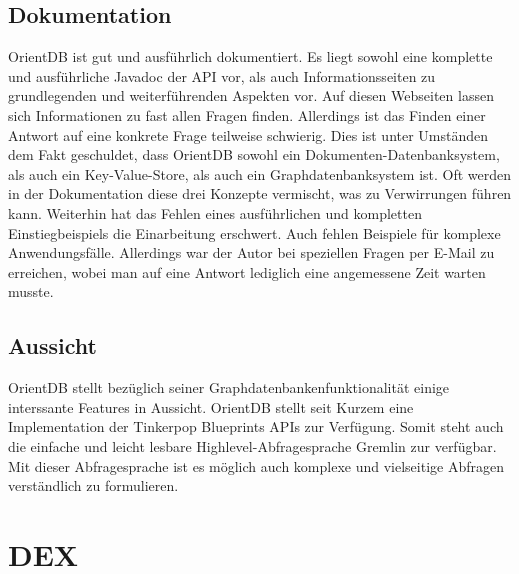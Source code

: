 \documentclass[11pt, a4paper, oneside, twocolumn]{article} %
\begin{document}
\subsection{Dokumentation}
OrientDB ist gut und ausführlich dokumentiert. Es liegt sowohl eine komplette und ausführliche Javadoc der API vor, als auch Informationsseiten zu grundlegenden und weiterführenden Aspekten vor. Auf diesen Webseiten lassen sich Informationen zu fast allen Fragen finden. Allerdings ist das Finden einer Antwort auf eine konkrete Frage teilweise schwierig. Dies ist unter Umständen dem Fakt geschuldet, dass OrientDB sowohl ein Dokumenten-Datenbanksystem, als auch ein Key-Value-Store, als auch ein Graphdatenbanksystem ist. Oft werden in der Dokumentation diese drei Konzepte vermischt, was zu Verwirrungen führen kann. Weiterhin hat das Fehlen eines ausführlichen und kompletten Einstiegbeispiels die Einarbeitung erschwert. Auch fehlen Beispiele für komplexe Anwendungsfälle. Allerdings war der Autor bei speziellen Fragen per E-Mail zu erreichen, wobei man auf eine Antwort lediglich eine angemessene Zeit warten musste.

\subsection{Aussicht}
OrientDB stellt bezüglich seiner Graphdatenbankenfunktionalität einige interssante Features in Aussicht. OrientDB stellt seit Kurzem eine Implementation der Tinkerpop Blueprints APIs zur Verfügung. Somit steht auch die einfache und leicht lesbare Highlevel-Abfragesprache Gremlin zur verfügbar. Mit dieser Abfragesprache ist es möglich auch komplexe und vielseitige Abfragen verständlich zu formulieren.


\section{DEX}
\end{document}
